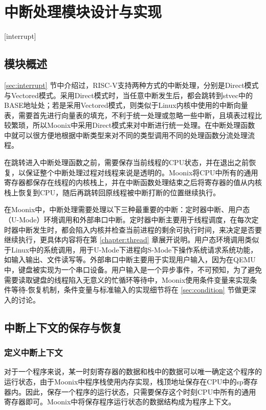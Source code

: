 
\chapter{中断处理模块设计与实现}[interrupt]
\label{chapter:interrupt}

\section{模块概述}

\ref{sec:interrupt} 节中介绍过，RISC-V支持两种方式的中断处理，分别是Direct模式与Vectored模式。采用Direct模式时，当任意中断发生后，都会跳转到stvec中的BASE地址处；若是采用Vectored模式，则类似于Linux内核中使用的中断向量表，需要首先进行向量表的填充，不利于统一处理或忽略一些中断，且填表过程比较繁琐，所以Moonix中采用Direct模式来对中断进行统一处理。在中断处理函数中就可以很方便地根据中断类型来对不同的类型调用不同的处理函数分流处理流程。

在跳转进入中断处理函数之前，需要保存当前线程的CPU状态，并在退出之前恢复，以保证整个中断处理过程对线程来说是透明的。Moonix将CPU中所有的通用寄存器都保存在线程的内核栈上，并在中断函数处理结束之后将寄存器的值从内核栈上恢复到CPU，随后再跳转回原线程被中断打断的位置继续执行。

在Moonix中，中断处理需要处理以下三种最重要的中断：定时器中断、用户态（U-Mode）环境调用和外部串口中断。定时器中断主要用于线程调度，在每次定时器中断发生时，都会陷入内核并检查当前进程的剩余可执行时间，来决定是否要继续执行，更具体内容将在第 \ref{chapter:thread} 章展开说明。用户态环境调用类似于Linux中的系统调用，用于U-Mode下进程向S-Mode下操作系统请求系统功能，如输入输出、文件读写等。外部串口中断主要用于实现用户输入，因为在QEMU中，键盘被实现为一个串口设备。用户输入是一个异步事件，不可预知，为了避免需要读取键盘的线程陷入无意义的忙循环等待中，Moonix使用条件变量来实现条件等待-恢复机制，条件变量与标准输入的实现细节将在 \ref{sec:condition} 节做更深入的讨论。

\section{中断上下文的保存与恢复}

\subsection{定义中断上下文}

对于一个程序来说，某一时刻寄存器的数据和栈中的数据可以唯一确定这个程序的运行状态，由于Moonix中程序栈使用内存实现，栈顶地址保存在CPU中的sp寄存器内。因此，保存一个程序的运行状态，只需要保存这个时刻CPU中所有的通用寄存器即可。Moonix中将保存程序运行状态的数据结构成为程序上下文。

